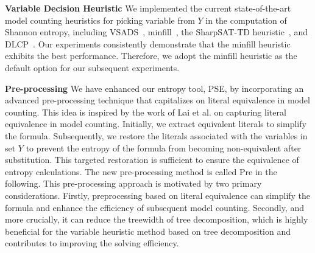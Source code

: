 


\textbf{Variable Decision Heuristic} 
We implemented the current state-of-the-art model counting heuristics for picking variable from $Y$ in the computation of Shannon entropy, including \textsf{VSADS}~\cite{sang2005heuristics}, \textsf{minfill}~\cite{darwiche2009modeling}, the \textsf{SharpSAT-TD} heuristic~\cite{korhonen2021integrating}, and \textsf{DLCP}~\cite{lai2021power}.
Our experiments consistently demonstrate that the \textsf{minfill} heuristic exhibits the best performance. Therefore, we adopt the \textsf{minfill} heuristic as the default option for our subsequent experiments.

\textbf{Pre-processing} 
We have enhanced our entropy tool, PSE, by incorporating an advanced pre-processing technique that capitalizes on literal equivalence in model counting. 
This idea is inspired by the work of Lai et al. \cite{lai2021power} on capturing literal equivalence in model counting.
Initially, we extract equivalent literals to simplify the formula. Subsequently, we restore the literals associated with the variables in set $Y$ to prevent the entropy of the formula from becoming non-equivalent after substitution. 
This targeted restoration is sufficient to ensure the equivalence of entropy calculations.
The new pre-processing method is called \textsf{Pre} in the following.
This pre-processing approach is motivated by two primary considerations. 
Firstly, preprocessing based on literal equivalence can simplify the formula and enhance the efficiency of subsequent model counting. Secondly, and more crucially, it can reduce the treewidth of tree decomposition, which is highly beneficial for the variable heuristic method based on tree decomposition and contributes to improving the solving efficiency.

\begin{comment}
	\begin{algorithm}[h]
		\caption{entropyComputing($\Phi$)}
		\label{entropyComputing}
		\LinesNumbered
		\KwIn{A CNF formula $\Phi$ }
		\KwOut{the $entropy$ of $\Phi$}
		\eIf{$count_{opt} = Counting$}{ 
			$c \leftarrow $ \texttt{Counting}($\Phi$) 
		}
		{  
			$c \leftarrow $ \texttt{Condition}($\Phi$) 
		}
		
		$p \leftarrow \frac{c}{totalcount} $
		
		$entropy \leftarrow -p \cdot \log {p}$
		
		
		\Return $  entropy$
	\end{algorithm}
\end{comment}


